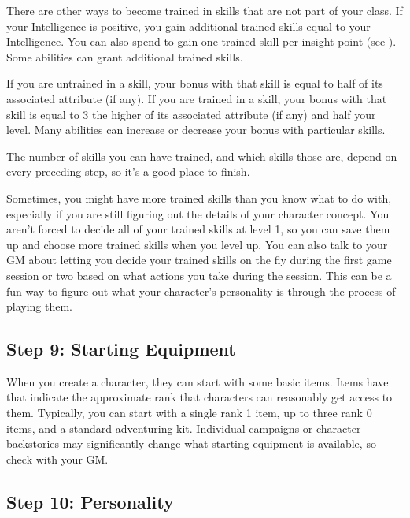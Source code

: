         There are other ways to become trained in skills that are not part of your class.
        If your Intelligence is positive, you gain additional trained skills equal to your Intelligence.
        You can also spend  to gain one trained skill per insight point (see ).
        Some abilities can grant additional trained skills.

        If you are untrained in a skill, your bonus with that skill is equal to half of its associated attribute (if any).
        If you are trained in a skill, your bonus with that skill is equal to 3 \add the higher of its associated attribute (if any) and half your level.
        Many abilities can increase or decrease your bonus with particular skills.

        The number of skills you can have trained, and which skills those are, depend on every preceding step, so it's a good place to finish.

        Sometimes, you might have more trained skills than you know what to do with, especially if you are still figuring out the details of your character concept.
        You aren't forced to decide all of your trained skills at level 1, so you can save them up and choose more trained skills when you level up.
        You can also talk to your GM about letting you decide your trained skills on the fly during the first game session or two based on what actions you take during the session.
        This can be a fun way to figure out what your character's personality is through the process of playing them.

    \subsection{Step 9: Starting Equipment}
        When you create a character, they can start with some basic items.
        Items have  that indicate the approximate rank that characters can reasonably get access to them.
        Typically, you can start with a single rank 1 item, up to three rank 0 items, and a standard adventuring kit.
        Individual campaigns or character backstories may significantly change what starting equipment is available, so check with your GM.

    \subsection{Step 10: Personality}

